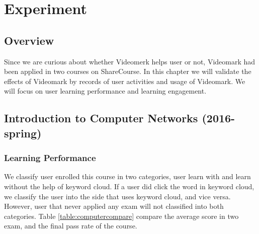 \chapter{Experiment}\label{cha:Experiment}

\section{Overview}
Since we are curious about whether Videomerk helps user or not, Videomark had been applied in two courses on ShareCourse.
In this chapter we will validate the effects of Videomark by records of user activities and usage of Videomark.
We will focus on user learning performance and learning engagement.

\section{Introduction to Computer Networks (2016-spring)}

\begin{table}[H]
\centering
\caption{Base Information of Introduction to Computer Network}
\label{table:computernet2016}
\end{table}

\subsection{Learning Performance}
We classify user enrolled this course in two categories, user learn with and learn without the help of keyword cloud.
If a user did click the word in keyword cloud, we classify the user into the side that uses keyword cloud, and vice versa.
However, user that never applied any exam will not classified into both categories.
Table \ref{table:computercompare} compare the average score in two exam, and the final pass rate of the course.

